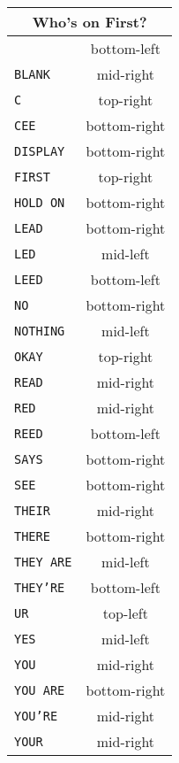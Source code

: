 \documentclass[11pt]{article}
\begin{document}
\newpage

\begin{multicols}{3}

\begin{tabular}{|l|c|}
\hline
\multicolumn{2}{|c|}{Who's on First?} \\
\hline
\texttt{}         & bottom-left  \\ \hline
\texttt{BLANK}    & mid-right    \\ \hline
\texttt{C}        & top-right    \\ \hline
\texttt{CEE}      & bottom-right \\ \hline
\texttt{DISPLAY}  & bottom-right \\ \hline
\texttt{FIRST}    & top-right    \\ \hline
\texttt{HOLD ON}  & bottom-right \\ \hline
\texttt{LEAD}     & bottom-right \\ \hline
\texttt{LED}      & mid-left     \\ \hline
\texttt{LEED}     & bottom-left  \\ \hline
\texttt{NO}       & bottom-right \\ \hline
\texttt{NOTHING}  & mid-left     \\ \hline
\texttt{OKAY}     & top-right    \\ \hline
\texttt{READ}     & mid-right    \\ \hline
\texttt{RED}      & mid-right    \\ \hline
\texttt{REED}     & bottom-left  \\ \hline
\texttt{SAYS}     & bottom-right \\ \hline
\texttt{SEE}      & bottom-right \\ \hline
\texttt{THEIR}    & mid-right    \\ \hline
\texttt{THERE}    & bottom-right \\ \hline
\texttt{THEY ARE} & mid-left     \\ \hline
\texttt{THEY'RE}  & bottom-left  \\ \hline
\texttt{UR}       & top-left     \\ \hline
\texttt{YES}      & mid-left     \\ \hline
\texttt{YOU}      & mid-right    \\ \hline
\texttt{YOU ARE}  & bottom-right \\ \hline
\texttt{YOU'RE}   & mid-right    \\ \hline
\texttt{YOUR}     & mid-right    \\ \hline
\end{tabular}


\end{multicols}
\end{document}
